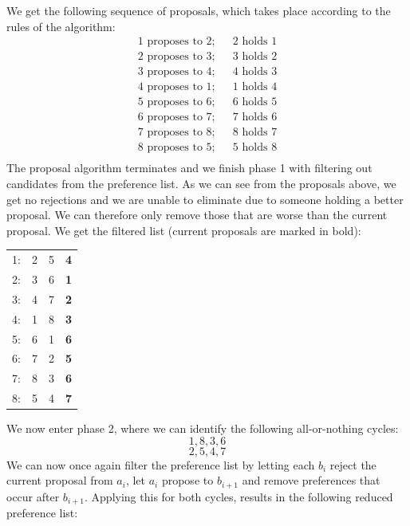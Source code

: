 \documentclass[a4paper]{article}
\begin{document}
We get the following sequence of proposals, which takes place according to the rules of the algorithm:
\begin{align*}
  \mbox{$1$ proposes to $2$;}& &\mbox{$2$ holds $1$}\\
  \mbox{$2$ proposes to $3$;}& &\mbox{$3$ holds $2$}\\
  \mbox{$3$ proposes to $4$;}& &\mbox{$4$ holds $3$}\\
  \mbox{$4$ proposes to $1$;}& &\mbox{$1$ holds $4$}\\
  \mbox{$5$ proposes to $6$;}& &\mbox{$6$ holds $5$}\\
  \mbox{$6$ proposes to $7$;}& &\mbox{$7$ holds $6$}\\
  \mbox{$7$ proposes to $8$;}& &\mbox{$8$ holds $7$}\\
  \mbox{$8$ proposes to $5$;}& &\mbox{$5$ holds $8$}\\
\end{align*}
The proposal algorithm terminates and we finish phase 1 with filtering out candidates from the preference list. As we can see from the proposals above, we get no rejections and we are unable to eliminate due to someone holding a better proposal. We can therefore only remove those that are worse than the current proposal. We get the filtered list (current proposals are marked in bold):
\begin{center}
    \begin{tabular}{ | c || c  c  c |}
          \hline
          1: & 2 & 5 & \textbf{4} \\
          2: & 3 & 6 & \textbf{1} \\
          3: & 4 & 7 & \textbf{2} \\
          4: & 1 & 8 & \textbf{3} \\
          5: & 6 & 1 & \textbf{6} \\
          6: & 7 & 2 & \textbf{5} \\
          7: & 8 & 3 & \textbf{6} \\
          8: & 5 & 4 & \textbf{7} \\
          \hline
    \end{tabular}
\end{center}
We now enter phase 2, where we can identify the following all-or-nothing cycles:
  $$ 1,8,3,6 $$
  $$ 2,5,4,7 $$
We can now once again filter the preference list by letting each $b_i$ reject the current proposal from $a_i$, let $a_i$ propose to $b_{i+1}$ and remove preferences that occur after $b_{i+1}$. Applying this for both cycles, results in the following reduced preference list:
\end{document}
